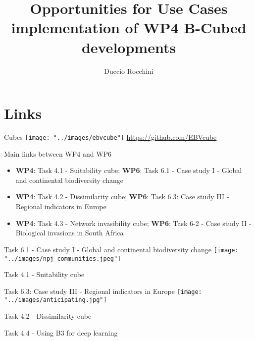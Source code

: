 \documentclass{beamer}
\title{Opportunities for Use Cases implementation of WP4 B-Cubed developments}
\author{Duccio Rocchini}
\institute{
\texttt{[image: "../images/b3logo.png"]}
}
\begin{document}
\maketitle


\section{Links}

\begin{frame}{Cubes}
\centering
\texttt{[image: "../images/ebvcube"]}
\bigskip
\url{https://github.com/EBVcube}
\end{frame}

\begin{frame}{Main links between WP4 and WP6}

\begin{itemize}
	\item \textbf{WP4}: Task 4.1 - Suitability cube; \textbf{WP6}: Task 6.1 - Case study I - Global and continental biodiversity change
	\pause \item \textbf{WP4}: Task 4.2 - Dissimilarity cube; \textbf{WP6}: Task 6.3: Case study III - Regional indicators in Europe
	\pause \item \textbf{WP4}:  Task 4.3 - Network invasibility cube; \textbf{WP6}: Task 6-2 - Case study II - Biological invasions in South Africa 
\end{itemize}
\end{frame}


\begin{frame}{Task 6.1 - Case study I - Global and continental biodiversity change}
\centering
\texttt{[image: "../images/npj\_communities.jpeg"]}

\smallskip
\scriptsize{Task 4.1 - Suitability cube}
\end{frame}


\begin{frame}{Task 6.3: Case study III - Regional indicators in Europe}
\centering 
\texttt{[image: "../images/anticipating.jpg"]}

\smallskip
\scriptsize{Task 4.2 - Dissimilarity cube}

\scriptsize{Task 4.4 - Using B3 for deep learning}
\end{frame}
\end{document}
